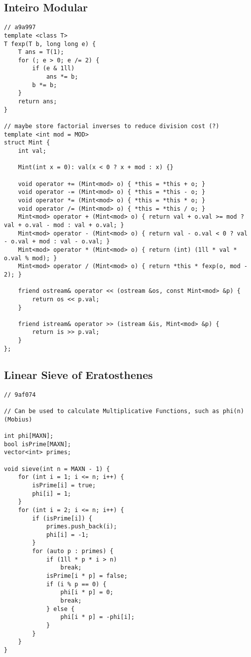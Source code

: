 \documentclass[12pt, a4paper, twoside]{article}
\begin{document}
\subsection{Inteiro Modular
}
\begin{lstlisting}
// a9a997
template <class T>
T fexp(T b, long long e) {
	T ans = T(1);
	for (; e > 0; e /= 2) {
		if (e & 1ll)
			ans *= b;
		b *= b;
	}
	return ans;
}

// maybe store factorial inverses to reduce division cost (?)
template <int mod = MOD>
struct Mint {
	int val;

	Mint(int x = 0): val(x < 0 ? x + mod : x) {}

	void operator += (Mint<mod> o) { *this = *this + o; }
	void operator -= (Mint<mod> o) { *this = *this - o; }
	void operator *= (Mint<mod> o) { *this = *this * o; }
	void operator /= (Mint<mod> o) { *this = *this / o; }
	Mint<mod> operator + (Mint<mod> o) { return val + o.val >= mod ? val + o.val - mod : val + o.val; }
	Mint<mod> operator - (Mint<mod> o) { return val - o.val < 0 ? val - o.val + mod : val - o.val; }
	Mint<mod> operator * (Mint<mod> o) { return (int) (1ll * val * o.val % mod); }
	Mint<mod> operator / (Mint<mod> o) { return *this * fexp(o, mod - 2); }

	friend ostream& operator << (ostream &os, const Mint<mod> &p) {
		return os << p.val;
	}

	friend istream& operator >> (istream &is, Mint<mod> &p) {
		return is >> p.val;
	}
};
\end{lstlisting}

\subsection{Linear Sieve of Eratosthenes
}
\begin{lstlisting}
// 9af074

// Can be used to calculate Multiplicative Functions, such as phi(n) (Mobius)

int phi[MAXN];
bool isPrime[MAXN];
vector<int> primes;

void sieve(int n = MAXN - 1) {
	for (int i = 1; i <= n; i++) {
		isPrime[i] = true;
		phi[i] = 1;
	}
	for (int i = 2; i <= n; i++) {
		if (isPrime[i]) {
			primes.push_back(i);
			phi[i] = -1;
		}
		for (auto p : primes) {
			if (1ll * p * i > n)
				break;
			isPrime[i * p] = false;
			if (i % p == 0) {
				phi[i * p] = 0;
				break;
			} else {
				phi[i * p] = -phi[i];
			}
		}
	}
}
\end{lstlisting}
\end{document}
